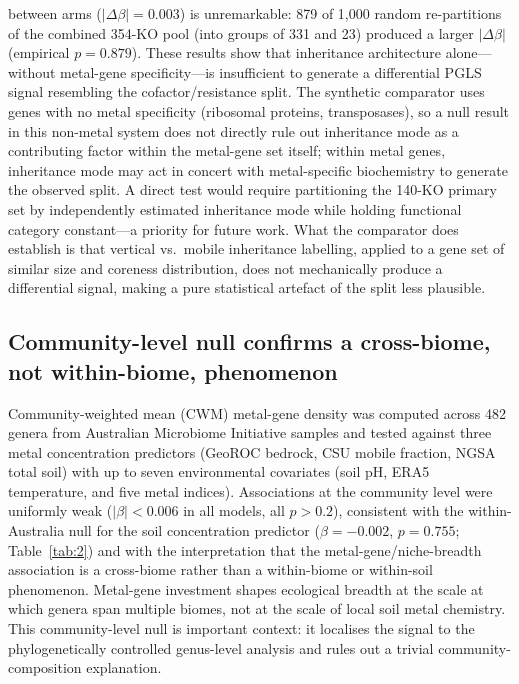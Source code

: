 \documentclass[times]{zHenriquesLab-StyleBioRxiv}
\begin{document}
between arms ($|\Delta\beta| = 0.003$) is unremarkable: 879 of 1,000 random
re-partitions of the combined 354-KO pool (into groups of 331 and 23) produced
a larger $|\Delta\beta|$ (empirical $p = 0.879$).
These results show that inheritance architecture alone---without metal-gene
specificity---is insufficient to generate a differential PGLS signal resembling
the cofactor/resistance split.
The synthetic comparator uses genes with no metal specificity (ribosomal proteins,
transposases), so a null result in this non-metal system does not directly rule
out inheritance mode as a contributing factor within the metal-gene set itself;
within metal genes, inheritance mode may act in concert with metal-specific
biochemistry to generate the observed split. A direct test would require
partitioning the 140-KO primary set by independently estimated inheritance mode
while holding functional category constant---a priority for future work.
What the comparator does establish is that vertical vs.\ mobile inheritance
labelling, applied to a gene set of similar size and coreness distribution,
does not mechanically produce a differential signal, making a pure statistical
artefact of the split less plausible.



\subsection{Community-level null confirms a cross-biome, not within-biome,
phenomenon}
\label{sec:cwm}

Community-weighted mean (CWM) metal-gene density was computed across 482 genera
from Australian Microbiome Initiative samples and tested against three metal
concentration predictors (GeoROC bedrock, CSU mobile fraction, NGSA total soil)
with up to seven environmental covariates (soil pH, ERA5 temperature, and five
metal indices). Associations at the community level were uniformly weak
($|\beta| < 0.006$ in all models, all $p > 0.2$), consistent with the
within-Australia null for the soil concentration predictor ($\beta = -0.002$,
$p = 0.755$; Table~\ref{tab:2}) and with the interpretation that the
metal-gene/niche-breadth association is a cross-biome rather than a within-biome
or within-soil phenomenon. Metal-gene investment shapes ecological breadth at the
scale at which genera span multiple biomes, not at the scale of local soil metal
chemistry. This community-level null is important context: it localises the
signal to the phylogenetically controlled genus-level analysis and rules out a
trivial community-composition explanation.
\end{document}
